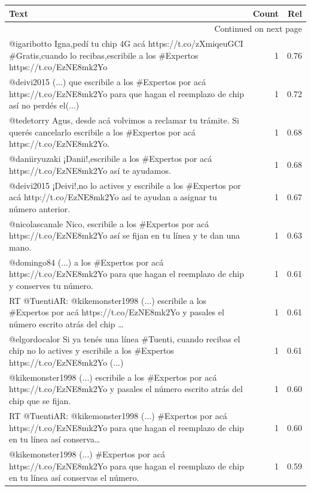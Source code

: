 \begin{longtable}{p{12.5cm}rr}
\toprule
Text & Count & Rel \\
\midrule
\endhead
\midrule
\multicolumn{3}{r}{{Continued on next page}} \\
\midrule
\endfoot

\bottomrule
\endlastfoot
@igaribotto Igna,pedí tu chip 4G acá https://t.co/zXmiqeuGCI \#Gratis,cuando lo recibas,escribile a los \#Expertos https://t.co/EzNE8mk2Yo & 1 & 0.76 \\
@deivi2015 (...)  que escribile a los \#Expertos por acá https://t.co/EzNE8mk2Yo para que hagan el reemplazo de chip  así no perdés el(...) & 1 & 0.72 \\
@tedetorry Agus, desde acá volvimos a reclamar tu trámite. Si querés cancelarlo escribile a los \#Expertos por acá https://t.co/EzNE8mk2Yo. & 1 & 0.68 \\
@daniiryuzaki ¡Danii!,escribile a los \#Expertos por acá https://t.co/EzNE8mk2Yo así te ayudamos. & 1 & 0.68 \\
@deivi2015 ¡Deivi!,no lo actives y escribile a los \#Expertos por acá http://t.co/EzNE8mk2Yo así te ayudan a asignar tu número anterior. & 1 & 0.67 \\
@nicolascanale Nico, escribile a los \#Expertos por acá https://t.co/EzNE8mk2Yo así se fijan en tu línea y te dan una mano. & 1 & 0.63 \\
@domingo84 (...) a los \#Expertos por acá https://t.co/EzNE8mk2Yo para que hagan el reemplazo de chip y conserves tu número. & 1 & 0.61 \\
RT @TuentiAR: @kikemonster1998 (...) escribile a los \#Expertos por acá  https://t.co/EzNE8mk2Yo y pasales el número escrito atrás del chip … & 1 & 0.61 \\
@elgordocalor Si ya tenés una línea \#Tuenti, cuando recibas el chip no lo actives y escribile a los \#Expertos https://t.co/EzNE8mk2Yo (...) & 1 & 0.61 \\
@kikemonster1998 (...) escribile a los \#Expertos por acá  https://t.co/EzNE8mk2Yo y pasales el número escrito atrás del chip que se fijan. & 1 & 0.60 \\
RT @TuentiAR: @kikemonster1998 (...) \#Expertos por acá https://t.co/EzNE8mk2Yo para que hagan el reemplazo de chip en tu línea así conserva… & 1 & 0.60 \\
@kikemonster1998 (...) \#Expertos por acá https://t.co/EzNE8mk2Yo para que hagan el reemplazo de chip en tu línea así conservas el número. & 1 & 0.59 \\

\end{longtable}
